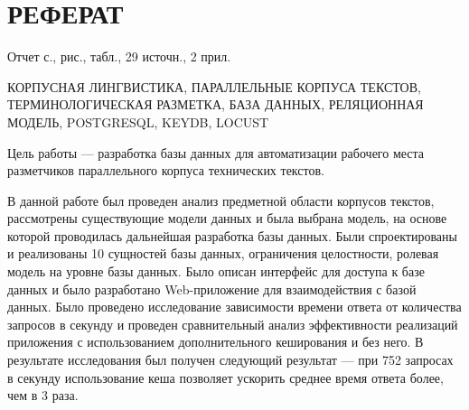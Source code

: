 \section*{РЕФЕРАТ}

Отчет \pageref{LastPage} с.,  рис.,  табл., 29 источн., 2 прил.

КОРПУСНАЯ ЛИНГВИСТИКА,
ПАРАЛЛЕЛЬНЫЕ КОРПУСА ТЕКСТОВ,
ТЕРМИНОЛОГИЧЕСКАЯ РАЗМЕТКА,
БАЗА ДАННЫХ,
РЕЛЯЦИОННАЯ МОДЕЛЬ,
POSTGRESQL,
KEYDB,
LOCUST

Цель работы --- разработка базы данных для автоматизации рабочего места разметчиков параллельного корпуса технических текстов.

В данной работе был проведен анализ предметной области корпусов текстов, рассмотрены существующие модели данных и была выбрана модель, на основе которой проводилась дальнейшая разработка базы данных.
Были спроектированы и реализованы 10 сущностей базы данных, ограничения целостности, ролевая модель на уровне базы данных.
Было описан интерфейс для доступа к базе данных и было разработано Web-приложение для взаимодействия с базой данных.
Было проведено исследование зависимости времени ответа от количества запросов в секунду и проведен сравнительный анализ эффективности реализаций приложения с использованием дополнительного кеширования и без него.
В результате исследования был получен следующий результат --- при 752 запросах в секунду использование кеша позволяет ускорить среднее время ответа более, чем в 3 раза.
